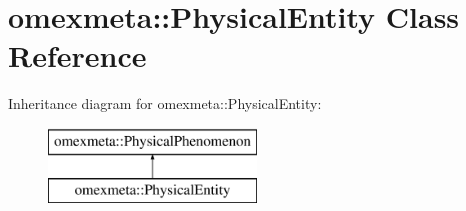\hypertarget{classomexmeta_1_1PhysicalEntity}{}\section{omexmeta\+:\+:Physical\+Entity Class Reference}
\label{classomexmeta_1_1PhysicalEntity}
Inheritance diagram for omexmeta\+:\+:Physical\+Entity\+:\begin{figure}[H]
\begin{center}
\leavevmode
\includegraphics[height=2.000000cm]{classomexmeta_1_1PhysicalEntity}
\end{center}
\end{figure}
